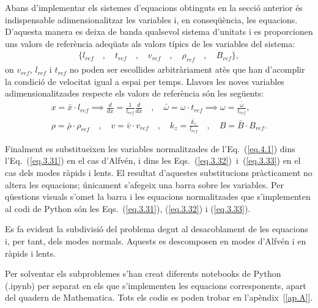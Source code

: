 \documentclass[12pt,a4paper]{article}
\numberwithin{equation}{section}
\begin{document}
Abans d'implementar els sistemes d'equacions obtinguts en la secció anterior %
és indispensable adimensionalitzar les variables i, en conseqüència, les equacions.
D'aquesta manera es deixa de banda qualsevol sistema d'unitats i es proporcionen uns valors de referència adeqüats als valors típics de les variables del sistema:
\begin{align*}
    \bigl\{  l_{ref} \quad , \quad t_{ref} \quad , \quad v_{ref} \quad , \quad \rho_{ref} \quad , \quad B_{ref} \bigr\},
\end{align*}
on $v_{ref}$, $l_{ref}$ i $t_{ref}$ no poden ser escollides arbitràriament atès que han d'acomplir la condició de velocitat igual a espai per temps.
Llavors les noves variables adimensionalitzades respecte els valors de referència són les següents:
\begin{equation}
  \begin{gathered}
    x = \bar{x} \cdot l_{ref}  \implies \frac{d}{dx} = \frac{1}{l_{ref}} \frac{d}{d \bar{x}} \quad , \quad \bar{\omega} = \omega \cdot t_{ref} \implies \omega = \frac{\bar{\omega}}{t_{ref}}, \\
    \rho = \bar{\rho} \cdot \rho_{ref} \quad , \quad v = \bar{v} \cdot v_{ref} \quad , \quad k_z = \frac{\bar{k_z}}{l_{ref}} \quad , \quad B = \bar{B} \cdot B_{ref}.
\end{gathered}
\tag{4.1} \label{eq.4.1}
\end{equation}

Finalment es substitueixen les variables normalitzades de l'Eq.~(\ref{eq.4.1}) dins l'Eq.~(\ref{eq.3.31}) en el cas d'Alfvén,
i dins les Eqs.~(\ref{eq.3.32})~i~(\ref{eq.3.33}) en el cas dels modes ràpids i lents.
El resultat d'aquestes substitucions pràcticament no altera les equacions; únicament s'afegeix una barra sobre les variables.
Per qüestions visuals s'omet la barra i les equacions normalitzades que s'implementen al codi de Python són les Eqs.~(\ref{eq.3.31}), (\ref{eq.3.32}) i (\ref{eq.3.33}).

Es fa evident la subdivisió del problema degut al desacoblament de les equacions i, per tant, dels modes normals.
Aquests es descomposen en modes d'Alfvén i en ràpids i lents.

Per solventar els subproblemes s'han creat diferents notebooks de Python (.ipynb) per separat en els que s'implementen les equacions corresponents,
apart del quadern de Mathematica. Tots els codis es poden trobar en l'apèndix~[\ref{ap.A}]. %
\end{document}
